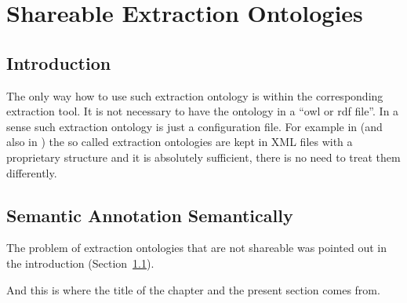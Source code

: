 \chapter{Shareable Extraction Ontologies} \label{ch:Shareable_Extraction_Ontologies}

\graphicspath{{../img/ch70/}}



\section{Introduction} \label{sec:ch70_intro}

The only way how to use such extraction ontology is within the corresponding extraction tool. It is not necessary to have the ontology in a ``owl or rdf file''. In a sense such extraction ontology is just a configuration file. For example in \citep{springerlink:10.1007/978-3-642-01891-6_5} %
 (and also in \citep{DBLP:conf/er/EmbleyTL02}) the so called extraction ontologies are kept in XML files with a proprietary structure and it is absolutely sufficient, there is no need to treat them differently.









\section{Semantic Annotation Semantically} \label{sec:main}

The problem of extraction ontologies that are not shareable was pointed out in the introduction (Section~\ref{sec:ch70_intro}). 

And this is where the title of the chapter and the present section comes from. 




